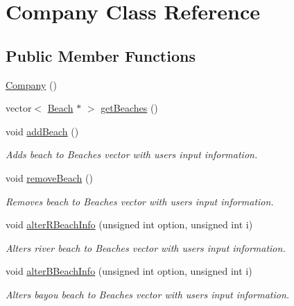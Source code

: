 \hypertarget{class_company}{}\section{Company Class Reference}
\label{class_company}
\subsection*{Public Member Functions}
\begin{DoxyCompactItemize}
\item 
\hyperlink{class_company_a29937dda711b09df306ae7ca9b3d6b42}{Company} ()
\item 
vector$<$ \hyperlink{class_beach}{Beach} $\ast$ $>$ \hyperlink{class_company_a5551b69f0b6de3037f7a3a4ca4d3c48a}{get\+Beaches} ()
\item 
\mbox{\label{class_company_a637bea6b73fee60679b2786c7be03694}} 
void \hyperlink{class_company_a637bea6b73fee60679b2786c7be03694}{add\+Beach} ()
\begin{DoxyCompactList}\small\item\em Adds beach to Beaches\textquotesingle{} vector with user\textquotesingle{}s input information. \end{DoxyCompactList}\item 
\mbox{\label{class_company_a3936079f764ee1b095389eb526511e85}} 
void \hyperlink{class_company_a3936079f764ee1b095389eb526511e85}{remove\+Beach} ()
\begin{DoxyCompactList}\small\item\em Removes beach to Beaches\textquotesingle{} vector with user\textquotesingle{}s input information. \end{DoxyCompactList}\item 
void \hyperlink{class_company_a584718d76eabe565779c41f3d047eb77}{alter\+R\+Beach\+Info} (unsigned int option, unsigned int i)
\begin{DoxyCompactList}\small\item\em Alters river beach to Beaches\textquotesingle{} vector with user\textquotesingle{}s input information. \end{DoxyCompactList}\item 
void \hyperlink{class_company_a77499b6ff8a4913bdb00843613467e56}{alter\+B\+Beach\+Info} (unsigned int option, unsigned int i)
\begin{DoxyCompactList}\small\item\em Alters bayou beach to Beaches\textquotesingle{} vector with user\textquotesingle{}s input information. \end{DoxyCompactList}\item 

\end{DoxyCompactItemize}
